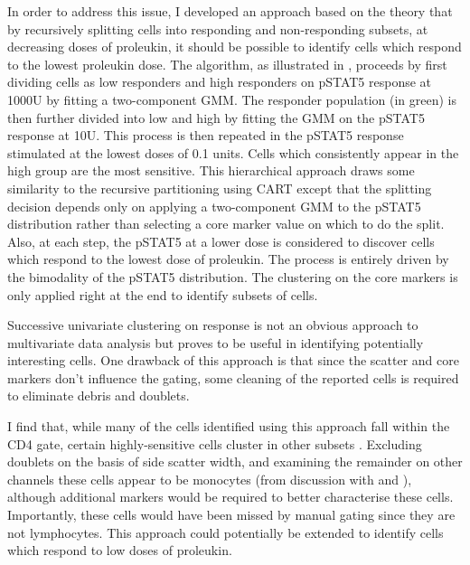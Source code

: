 In order to address this issue, I developed an approach based on the theory that by recursively splitting cells
into responding and non-responding subsets, at decreasing doses of proleukin,
it should be possible to identify cells which respond to the lowest proleukin dose.
The algorithm, as illustrated in , proceeds by first dividing cells as low responders and high responders on pSTAT5 response at 1000U 
by fitting a two-component \gls{GMM}.
The responder population (in green) is then further divided into low and high by fitting the \gls{GMM} on the pSTAT5 response at 10U.
This process is then repeated in the pSTAT5 response stimulated at the lowest doses of 0.1 units.
Cells which consistently appear in the high group are the most sensitive.
This hierarchical approach draws some similarity to the recursive partitioning using \gls{CART} except that the splitting decision depends only
on applying a two-component \gls{GMM} to the pSTAT5 distribution rather than selecting a core marker value on which to do the split.
Also, at each step, the pSTAT5 at a lower dose is considered to discover cells which respond to the lowest dose of proleukin.
The process is entirely driven by the bimodality of the pSTAT5 distribution.
The clustering on the core markers is only applied right at the end to identify subsets of cells.




Successive univariate clustering on response is not an obvious approach to multivariate data analysis but proves to be useful in identifying potentially interesting cells.
One drawback of this approach is that since the scatter and core markers don't influence the gating, some cleaning of the reported cells is required to eliminate
debris and doublets.

I find that, while many of the cells identified using this approach fall within the CD4 gate,
certain highly-sensitive cells cluster in other subsets .
Excluding doublets on the basis of side scatter width,
and examining the remainder on other channels these cells appear to be monocytes (from discussion with  and ),
although additional markers would be required to better characterise these cells.
Importantly, these cells would have been missed by manual gating since they are not lymphocytes.
This approach could potentially be extended to identify cells which respond to low doses of proleukin.


